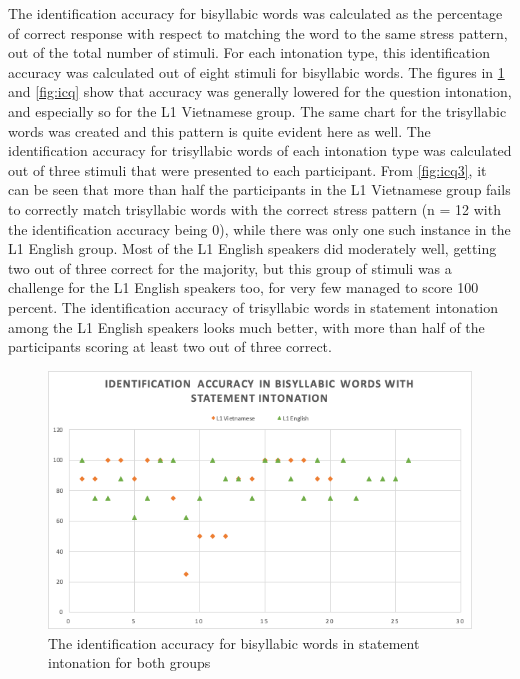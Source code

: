 \documentclass[a4paper]{article}
\begin{document}
The identification accuracy for bisyllabic words was calculated as the percentage of correct response with respect to matching the word to the same stress pattern, out of the total number of stimuli. For each intonation type, this identification accuracy was calculated out of eight stimuli for bisyllabic words. The figures in \ref{fig:ics} and \ref{fig:icq} show that accuracy was generally lowered for the question intonation, and especially so for the L1 Vietnamese group. The same chart for the trisyllabic words was created and this pattern is quite evident here as well. The identification accuracy for trisyllabic words of each intonation type was calculated out of three stimuli that were presented to each participant. From \ref{fig:icq3}, it can be seen that more than half the participants in the L1 Vietnamese group fails to correctly match trisyllabic words with the correct stress pattern (n = 12 with the identification accuracy being 0), while there was only one such instance in the L1 English group. Most of the L1 English speakers did moderately well, getting two out of three correct for the majority, but this group of stimuli was a challenge for the L1 English speakers too, for very few managed to score 100 percent. The identification accuracy of trisyllabic words in statement intonation among the L1 English speakers looks much better, with more than half of the participants scoring at least two out of three correct.

\begin{figure}[H]
\begin{center}  
\includegraphics[scale=0.7]{identification-accuracy-statement.png} 
\caption{The identification accuracy for bisyllabic words in statement intonation for both groups}
\label{fig:ics}
\end{center}   
\end{figure}
\end{document}
